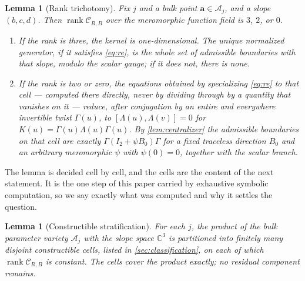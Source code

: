 \documentclass[11pt,reqno]{amsart}
\theoremstyle{plain}
\newtheorem{lemma}[theorem]{Lemma}
\theoremstyle{definition}
\theoremstyle{remark}
\numberwithin{equation}{section}
\providecommand{\rank}{\operatorname{rank}}
\newcommand{\C}{\mathbb C}
\newcommand{\Id}{I_2}
\begin{document}
\begin{lemma}[Rank trichotomy]
\label{lem:trichotomy}
Fix $j$ and a bulk point $\mathbf a\in\mathcal A_j$, and a slope $(b,c,d)$. Then
$\rank\mathcal C_{R,B}$ over the meromorphic function field is $3$, $2$, or $0$.
\begin{enumerate}
\item If the rank is three, the kernel is one-dimensional. The unique normalized
generator, if it satisfies \cref{eq:re}, is the whole set of admissible
boundaries with that slope, modulo the scalar gauge; if it does not, there is
none.
\item If the rank is two or zero, the equations obtained by specializing
\cref{eq:re} to that cell --- computed there directly, never by dividing through
by a quantity that vanishes on it --- reduce, after conjugation by an entire and
everywhere invertible twist $\Gamma(u)$, to $[\Lambda(u),\Lambda(v)]=0$ for
$K(u)=\Gamma(u)\Lambda(u)\Gamma(u)$. By \cref{lem:centralizer} the admissible
boundaries on that cell are exactly $\Gamma(\Id+\psi B_0)\Gamma$ for a fixed
traceless direction $B_0$ and an arbitrary meromorphic $\psi$ with $\psi(0)=0$,
together with the scalar branch.
\end{enumerate}
\end{lemma}

The lemma is decided cell by cell, and the cells are the content of the next
statement. It is the one step of this paper carried by exhaustive symbolic
computation, so we say exactly what was computed and why it settles the question.

\begin{lemma}[Constructible stratification]
\label{lem:stratification}
For each $j$, the product of the bulk parameter variety $\mathcal A_j$ with the
slope space $\C^3$ is partitioned into finitely many disjoint constructible
cells, listed in \cref{sec:classification}, on each of which
$\rank\mathcal C_{R,B}$ is constant. The cells cover the product exactly; no
residual component remains.
\end{lemma}
\end{document}
